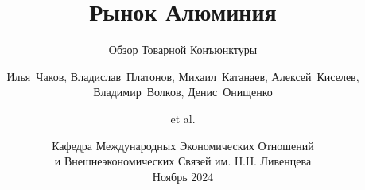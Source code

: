 \title[Экономическая Конъюнктура] %
{Рынок Алюминия}

\subtitle{Обзор Товарной Конъюнктуры}

\author[4-МЭО-5] %
{Илья~Чаков, 
Владислав~Платонов, 
Михаил~Катанаев, 
Алексей~Киселев, 
Владимир~Волков, 
Денис~Онищенко 
\and et al.}


\date[2024/2025 Учебный Год] %
{Кафедра Международных Экономических Отношений \\
и Внешнеэкономических Связей им. Н.Н. Ливенцева \\
Ноябрь 2024}